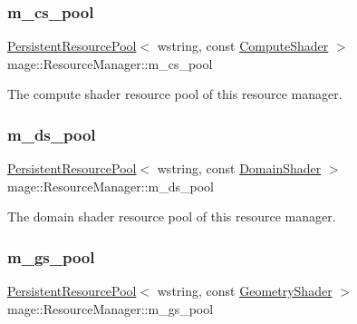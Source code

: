\subsubsection{\texorpdfstring{m\+\_\+cs\+\_\+pool}{m\_cs\_pool}}
{\footnotesize\ttfamily \hyperlink{classmage_1_1_persistent_resource_pool}{Persistent\+Resource\+Pool}$<$ wstring, const \hyperlink{namespacemage_ae040329401484b076f0cd1a7c43d19c9}{Compute\+Shader} $>$ mage\+::\+Resource\+Manager\+::m\+\_\+cs\+\_\+pool\hspace{0.3cm}{\ttfamily [private]}}

The compute shader resource pool of this resource manager. \hypertarget{classmage_1_1_resource_manager_a4e9ddded7fb67fb172fdcd39481f0fa9}{}\label{classmage_1_1_resource_manager_a4e9ddded7fb67fb172fdcd39481f0fa9} 
\subsubsection{\texorpdfstring{m\+\_\+ds\+\_\+pool}{m\_ds\_pool}}
{\footnotesize\ttfamily \hyperlink{classmage_1_1_persistent_resource_pool}{Persistent\+Resource\+Pool}$<$ wstring, const \hyperlink{namespacemage_aef8cda73e2387cb89baa6c54a7fea542}{Domain\+Shader} $>$ mage\+::\+Resource\+Manager\+::m\+\_\+ds\+\_\+pool\hspace{0.3cm}{\ttfamily [private]}}

The domain shader resource pool of this resource manager. \hypertarget{classmage_1_1_resource_manager_a4ee2d44efc1e07cb66f9aff2f36b1ef1}{}\label{classmage_1_1_resource_manager_a4ee2d44efc1e07cb66f9aff2f36b1ef1} 
\subsubsection{\texorpdfstring{m\+\_\+gs\+\_\+pool}{m\_gs\_pool}}
{\footnotesize\ttfamily \hyperlink{classmage_1_1_persistent_resource_pool}{Persistent\+Resource\+Pool}$<$ wstring, const \hyperlink{namespacemage_a0cf0bb4b74903e78658c96412d5687a6}{Geometry\+Shader} $>$ mage\+::\+Resource\+Manager\+::m\+\_\+gs\+\_\+pool\hspace{0.3cm}{\ttfamily [private]}}

